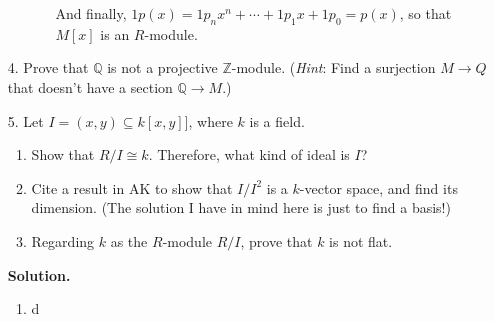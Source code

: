 \documentclass[9pt]{article}
\newcommand{\Z}{\mathbb{Z}}
\newcommand{\Q}{\mathbb{Q}}
\begin{document}
\begin{enumerate}
\begin{enumerate}
\begin{itemize}
                  And finally, $1p(x) = 1p_nx^n + \cdots + 1p_1x + 1p_0 = p(x)$,
                  so that $M[x]$ is an $R$-module.
               \end{itemize}
      \end{enumerate}
   \item[4.]   Prove that $\Q$ is not a projective $\Z$-module. (\textit{Hint}:
               Find a surjection $M \rightarrow Q$ that doesn't have a section
               $\Q \rightarrow M$.)
   \item[5.]   Let $I = (x, y) \subseteq k[x, y]]$, where $k$ is a field.
               \begin{enumerate}
                  \item Show that $R/I \cong k$. Therefore, what kind of ideal
                        is $I$?
                  \item Cite a result in AK to show that $I/I^2$ is a $k$-vector
                        space, and find its dimension. (The solution I have in
                        mind here is just to find a basis!)
                  \item Regarding $k$ as the $R$-module $R/I$, prove that $k$ is
                        not flat.
               \end{enumerate}

      \textbf{Solution.}
      
      \begin{enumerate}
         \item d
      \end{enumerate}
\end{enumerate}
\end{document}
